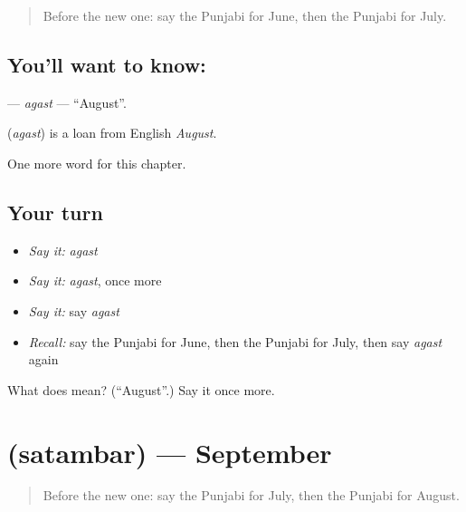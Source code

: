\label{lesson:PA-C102-agast}



\begin{quote}
Before the new one: say the Punjabi for June, then the Punjabi for July.
\end{quote}

\subsection*{You'll want to know: }
\textbf{} — \emph{agast} — \textquotedblleft{}August\textquotedblright{}.

\begin{cousinweb}
\textbf{} (\emph{agast}) is a loan from English \emph{August}.
\end{cousinweb}

\begin{grammarlens}[title={What you've built}]
One more word for this chapter.
\end{grammarlens}

\subsection*{Your turn}
\begin{itemize}
\raggedright
  \item \emph{Say it:} \emph{agast}
  \item \emph{Say it:} \emph{agast}, once more
  \item \emph{Say it:} say \emph{agast}
  \item \emph{Recall:} say the Punjabi for June, then the Punjabi for July, then say \emph{agast} again
\end{itemize}

\begin{tcolorbox}[breakable,colback=teal!4,colframe=teal!35!black,title={Before you move on}]
What does  mean? (\textquotedblleft{}August\textquotedblright{}.) Say it once more.
\end{tcolorbox}
\section[\texorpdfstring{\pa{ਸਤੰਬਰ} (satambar)}{ਸਤੰਬਰ (satambar)}]{ (satambar) — September}

\label{lesson:PA-C102-satambar}



\begin{quote}
Before the new one: say the Punjabi for July, then the Punjabi for August.
\end{quote}

